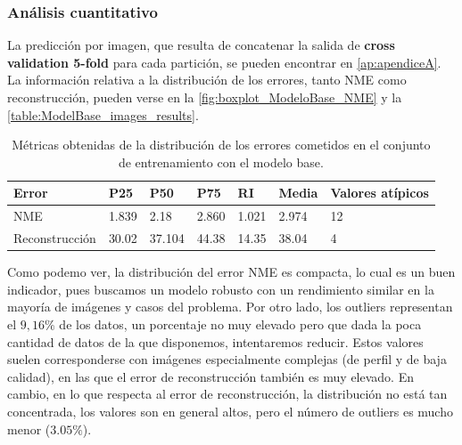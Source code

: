         \subsubsection*{Análisis cuantitativo}

        \noindent La predicción por imagen, que resulta de concatenar la salida de \textbf{cross validation 5-fold } para cada partición, se pueden encontrar en \autoref{ap:apendiceA}. La información relativa a la distribución de los errores, tanto NME como reconstrucción, pueden verse en la \autoref{fig:boxplot_ModeloBase_NME} y la \autoref{table:ModelBase_images_results}.

        \begin{table}[!ht]
            \centering
            \caption{Métricas obtenidas de la distribución de los errores cometidos en el conjunto de entrenamiento con el modelo base.}
            \begin{tabular}{|l|l|l|l|l|l|l|}
            \hline
                \cellcolor{gray!25}\textbf{Error} & \cellcolor{gray!25}\textbf{P25} & \cellcolor{gray!25}\textbf{P50} & \cellcolor{gray!25}\textbf{P75} & \cellcolor{gray!25}\textbf{RI} & \cellcolor{gray!25}\textbf{Media} & \cellcolor{gray!25}\textbf{Valores atípicos} \\ \hline
                NME & 1.839 & 2.18 & 2.860 & 1.021 & 2.974 & 12 \\ \hline
                Reconstrucción & 30.02 & 37.104 & 44.38 & 14.35 & 38.04 & 4 \\ \hline
            \end{tabular}
            \label{table:ModelBase_images_results}
        \end{table}
         
        \medskip

        \noindent Como podemo ver, la distribución del error NME es compacta, lo cual es un buen indicador, pues buscamos un modelo robusto con un rendimiento similar en la mayoría de imágenes y casos del problema. Por otro lado, los outliers representan el $9,16 \%$ de los datos, un porcentaje no muy elevado pero que dada la poca cantidad de datos de la que disponemos, intentaremos reducir. Estos valores suelen corresponderse con imágenes especialmente complejas (de perfil y de baja calidad), en las que el error de reconstrucción también es muy elevado. En cambio, en lo que respecta al error de reconstrucción, la distribución no está tan concentrada, los valores son en general altos, pero el número de outliers es mucho menor ($3.05\%$).

